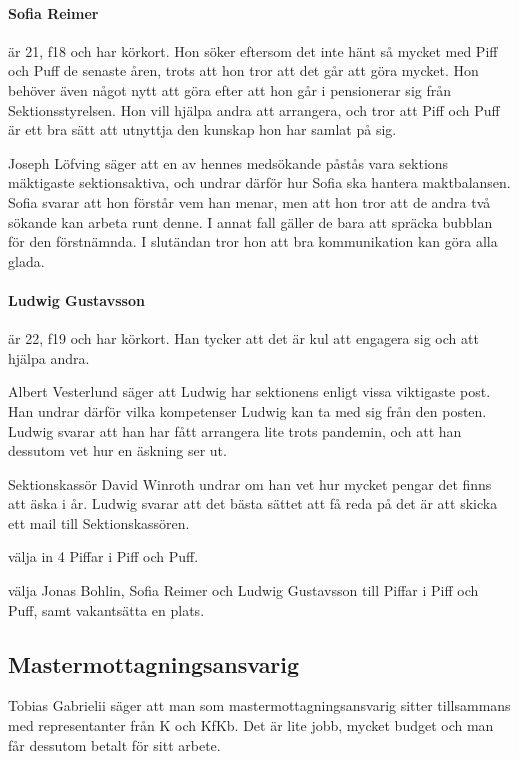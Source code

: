 \documentclass[hidelinks]{sektionsmote}
\begin{document}
\paragraph{Sofia Reimer} är 21, f18 och har körkort.
Hon söker eftersom det inte hänt så mycket med Piff och Puff de senaste åren, trots att hon tror att det går att göra mycket.
Hon behöver även något nytt att göra efter att hon går i pensionerar sig från Sektionsstyrelsen.
Hon vill hjälpa andra att arrangera, och tror att Piff och Puff är ett bra sätt att utnyttja den kunskap hon har samlat på sig.

Joseph Löfving säger att en av hennes medsökande påstås vara sektions mäktigaste sektionsaktiva, och undrar därför hur Sofia ska hantera maktbalansen.
Sofia svarar att hon förstår vem han menar, men att hon tror att de andra två sökande kan arbeta runt denne.
I annat fall gäller de bara att spräcka bubblan för den förstnämnda.
I slutändan tror hon att bra kommunikation kan göra alla glada.

\paragraph{Ludwig Gustavsson} är 22, f19 och har körkort.
Han tycker att det är kul att engagera sig och att hjälpa andra.

Albert Vesterlund säger att Ludwig har sektionens enligt vissa viktigaste post.
Han undrar därför vilka kompetenser Ludwig kan ta med sig från den posten.
Ludwig svarar att han har fått arrangera lite trots pandemin, och att han dessutom vet hur en äskning ser ut.

Sektionskassör David Winroth undrar om han vet hur mycket pengar det finns att äska i år.
Ludwig svarar att det bästa sättet att få reda på det är att skicka ett mail till Sektionskassören.

\begin{beslut}
  \item välja in 4 Piffar i Piff och Puff.
  \item välja Jonas Bohlin, Sofia Reimer och Ludwig Gustavsson till Piffar i Piff och Puff, samt vakantsätta en plats.
\end{beslut}


\subsection{Mastermottagningsansvarig}
Tobias Gabrielii säger att man som mastermottagningsansvarig sitter tillsammans med representanter från K och KfKb.
Det är lite jobb, mycket budget och man får dessutom betalt för sitt arbete.
\end{document}
